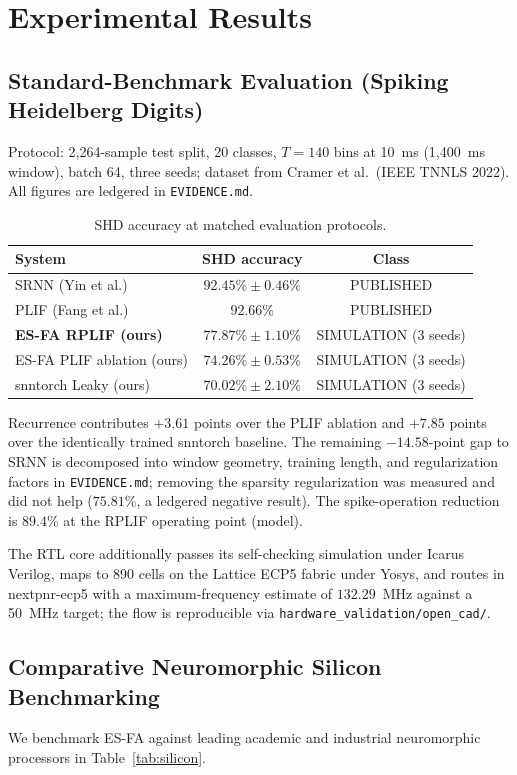 \documentclass[journal]{IEEEtran}
\theoremstyle{definition}
\begin{document}
\section{Experimental Results}
\subsection{Standard-Benchmark Evaluation (Spiking Heidelberg Digits)}
Protocol: 2{,}264-sample test split, 20 classes, $T=140$ bins at 10~ms (1{,}400~ms window), batch 64, three seeds; dataset from Cramer et al.\ (IEEE TNNLS 2022). All figures are ledgered in \texttt{EVIDENCE.md}.

\begin{table}[ht]
\centering
\caption{SHD accuracy at matched evaluation protocols.}
\label{tab:shd}
\begin{tabular}{lcc}
\hline
System & SHD accuracy & Class \\
\hline
SRNN (Yin et al.) & $92.45\% \pm 0.46\%$ & PUBLISHED \\
PLIF (Fang et al.) & $92.66\%$ & PUBLISHED \\
\textbf{ES-FA RPLIF (ours)} & $\mathbf{77.87\% \pm 1.10\%}$ & SIMULATION (3 seeds) \\
ES-FA PLIF ablation (ours) & $74.26\% \pm 0.53\%$ & SIMULATION (3 seeds) \\
snntorch Leaky (ours) & $70.02\% \pm 2.10\%$ & SIMULATION (3 seeds) \\
\hline
\end{tabular}
\end{table}

Recurrence contributes $+3.61$ points over the PLIF ablation and $+7.85$ points over the identically trained snntorch baseline. The remaining $-14.58$-point gap to SRNN is decomposed into window geometry, training length, and regularization factors in \texttt{EVIDENCE.md}; removing the sparsity regularization was measured and did not help ($75.81\%$, a ledgered negative result). The spike-operation reduction is $89.4\%$ at the RPLIF operating point (model).

The RTL core additionally passes its self-checking simulation under Icarus Verilog, maps to 890 cells on the Lattice ECP5 fabric under Yosys, and routes in nextpnr-ecp5 with a maximum-frequency estimate of $132.29$~MHz against a 50~MHz target; the flow is reproducible via \texttt{hardware\_validation/open\_cad/}.

\subsection{Comparative Neuromorphic Silicon Benchmarking}
We benchmark ES-FA against leading academic and industrial neuromorphic processors in Table~\ref{tab:silicon}.
\end{document}

